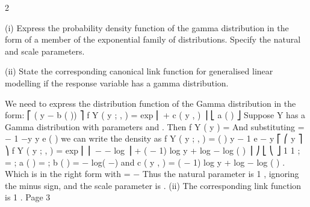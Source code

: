 \documentclass[a4paper,12pt]{article}
\begin{document}
2 \item (i)  Express the probability density function of the gamma distribution in the form
of a member of the exponential family of distributions. Specify the natural
and scale parameters.

\item (ii)  State the corresponding canonical link function for generalised linear
modelling if the response variable has a gamma distribution.

We need to express the distribution function of the Gamma distribution in the
form:
⎡ ( y \theta  − b ( \theta  ))
⎤
f Y ( y ; \theta  , \phi  ) = exp ⎢
+ c ( y , \phi  ) ⎥
⎣ a ( \phi  )
⎦
Suppose Y has a Gamma distribution with parameters \alpha  and \lambda  . Then
f Y ( y ) =
And substituting \lambda  =
\lambda  \alpha  \alpha − 1 −\lambda  y
y e
\Gamma  ( \alpha  )
\alpha 
we can write the density as
\mu
f Y ( y ; \theta  , \phi  ) =
\alpha  \alpha 
\mu \alpha  \Gamma  ( \alpha  )
y
\alpha − 1
e
−
y \alpha 
\mu
⎡ ⎛ y
⎤
⎞
f Y ( y ; \theta  , \phi  ) = exp ⎢ ⎜ − − log \mu ⎟ \alpha  + ( \alpha  − 1) log y + \alpha  log \alpha  − log \Gamma  ( \alpha  ) ⎥
⎠
⎣ ⎝ \mu
⎦
1
1
; \phi  = \alpha  ; a ( \phi  ) = ; b ( \theta  ) = − log( −\theta  )
\mu
\phi 
and c ( y , \phi  ) = ( \phi  − 1) log y + \phi  log \phi  − log \Gamma  ( \phi  ) .
Which is in the right form with \theta  = −
Thus the natural parameter is
1
, ignoring the minus sign, and the scale
\mu
parameter is \alpha  .
(ii)
The corresponding link function is
1
.
\mu
Page 3%
\end{document}
